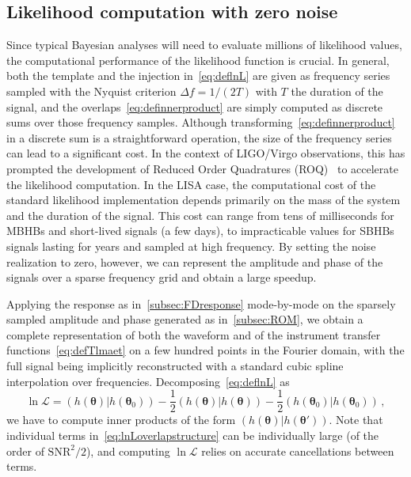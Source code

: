 \documentclass[aps,showpacs,twocolumn,prd,superscriptaddress,nofootinbib]{revtex4-1}
\newcommand{\be}{\begin{equation}}
\newcommand{\ee}{\end{equation}}
\newcommand\calL{{\mathcal{L}}}
\begin{document}

\subsection{Likelihood computation with zero noise}
\label{subsec:likelihood}

Since typical Bayesian analyses will need to evaluate millions of likelihood values, the computational performance of the likelihood function is crucial. In general, both the template and the injection in~\eqref{eq:deflnL} are given as frequency series sampled with the Nyquist criterion $\Delta f = 1/(2T)$ with $T$ the duration of the signal, and the overlaps~\eqref{eq:definnerproduct} are simply computed as discrete sums over those frequency samples. Although transforming~\eqref{eq:definnerproduct} in a discrete sum is a straightforward operation, the size of the frequency series can lead to a significant cost. In the context of LIGO/Virgo observations, this has prompted the development of Reduced Order Quadratures (ROQ)~\cite{Smith+14, Canizares+14, Smith+16} to accelerate the likelihood computation. In the LISA case, the computational cost of the standard likelihood implementation depends primarily on the mass of the system and the duration of the signal. This cost can range from tens of milliseconds for MBHBs and short-lived signals (a few days), to impracticable values for SBHBs signals lasting for years and sampled at high frequency.
By setting the noise realization to zero, however, we can represent the amplitude and phase of the signals over a sparse frequency grid and obtain a large speedup.

Applying the response as in~\ref{subsec:FDresponse} mode-by-mode on the sparsely sampled amplitude and phase generated as in~\ref{subsec:ROM}, we obtain a complete representation of both the waveform and of the instrument transfer functions~\eqref{eq:defTlmaet} on a few hundred points in the Fourier domain, with the full signal being implicitly reconstructed with a standard cubic spline interpolation over frequencies. Decomposing~\eqref{eq:deflnL} as
\be\label{eq:lnLoverlapstructure}
	\ln \calL = \left( h(\bm{\theta}) | h(\bm{\theta}_{0}) \right)- \frac{1}{2} \left( h(\bm{\theta}) | h(\bm{\theta}) \right) - \frac{1}{2} \left( h(\bm{\theta}_{0}) | h(\bm{\theta}_{0}) \right) \,,
\ee
we have to compute inner products of the form $\left( h(\bm{\theta}) | h(\bm{\theta'}) \right)$. Note that individual terms in~\eqref{eq:lnLoverlapstructure} can be individually large (of the order of $\mathrm{SNR}^{2}/2$), and computing $\ln \calL$ relies on accurate cancellations between terms.
\end{document}
